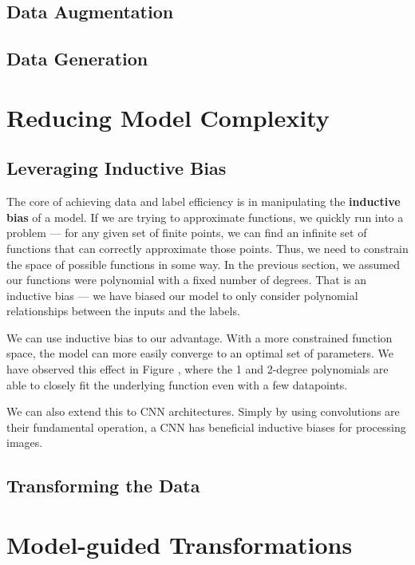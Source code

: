 	\subsection{Data Augmentation}

	\subsection{Data Generation}


\section{Reducing Model Complexity}

	\subsection{Leveraging Inductive Bias}
	
The core of achieving data and label efficiency is in manipulating the \textbf{inductive bias} of a model. If we are trying to approximate functions, we quickly run into a problem --- for any given set of finite points, we can find an infinite set of functions that can correctly approximate those points. Thus, we need to constrain the space of possible functions in some way. In the previous section, we assumed our functions were polynomial with a fixed number of degrees. That is an inductive bias --- we have biased our model to only consider polynomial relationships between the inputs and the labels.

We can use inductive bias to our advantage. With a more constrained function space, the model can more easily converge to an optimal set of parameters. We have observed this effect in Figure , where the 1 and 2-degree polynomials are able to closely fit the underlying function even with a few datapoints.

We can also extend this to CNN architectures. Simply by using convolutions are their fundamental operation, a CNN has beneficial inductive biases for processing images. 
	
	\subsection{Transforming the Data}
	
\section{Model-guided Transformations}

